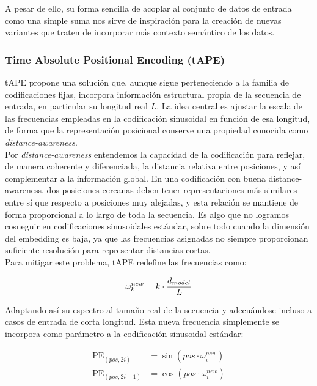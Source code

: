 A pesar de ello, su forma sencilla de acoplar al conjunto de datos de entrada como una simple suma nos sirve de inspiración para la creación de nuevas variantes que traten de incorporar más contexto semántico de los datos.

\subsubsection{Time Absolute Positional Encoding (tAPE)}

tAPE propone una solución que, aunque sigue perteneciendo a la familia de codificaciones fijas, incorpora información estructural propia de la secuencia de entrada, en particular su longitud real $L$. La idea central es ajustar la escala de las frecuencias empleadas en la codificación sinusoidal en función de esa longitud, de forma que la representación posicional conserve una propiedad conocida como \textit{distance-awareness}.\\

Por \textit{distance-awareness} entendemos la capacidad de la codificación para reflejar, de manera coherente y diferenciada, la distancia relativa entre posiciones, y así complementar a la información global. En una codificación con buena distance-awareness, dos posiciones cercanas deben tener representaciones más similares entre sí que respecto a posiciones muy alejadas, y esta relación se mantiene de forma proporcional a lo largo de toda la secuencia. Es algo que no logramos cosneguir en codificaciones sinusoidales estándar, sobre todo cuando la dimensión del embedding es baja, ya que las frecuencias asignadas no siempre proporcionan suficiente resolución para representar distancias cortas.\\

Para mitigar este problema, tAPE redefine las frecuencias como:

\begin{equation}
	\centering
	\omega^{new}_k = k \cdot \frac{d_{model}}{L}
\end{equation}

Adaptando así su espectro al tamaño real de la secuencia y adecuándose incluso a casos de entrada de corta longitud. Esta nueva frecuencia simplemente se incorpora como parámetro a la codificación sinusoidal estándar:

\begin{equation}
	\begin{aligned}
		\text{PE}_{(pos,2i)} &= \sin\!\left( pos \cdot \omega^{new}_i \right) \\
		\text{PE}_{(pos,2i+1)} &= \cos\!\left( pos \cdot \omega^{new}_i \right)
	\end{aligned}
\end{equation}


